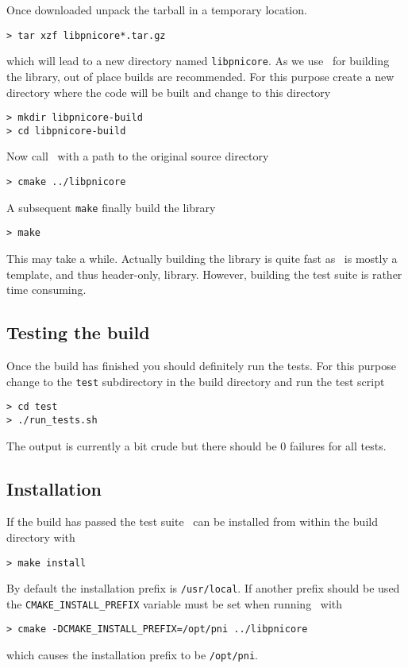 Once downloaded unpack the tarball in a temporary location. 
\begin{verbatim}
> tar xzf libpnicore*.tar.gz
\end{verbatim}
which will lead to a new directory named {\tt libpnicore}. As we use \cmake\ for
building the library, out of place builds are recommended. For this purpose 
create a new directory where the code will be built and change to this directory
\begin{verbatim}
> mkdir libpnicore-build
> cd libpnicore-build
\end{verbatim}
Now call \cmake\ with a path to the original source directory
\begin{verbatim}
> cmake ../libpnicore
\end{verbatim}
A subsequent {\tt make} finally build the library
\begin{verbatim}
> make
\end{verbatim}
This may take a while. Actually building the library is quite fast as
\libpnicore\ is mostly a template, and thus header-only, library. 
However, building the test suite is rather time consuming. 

\subsection{Testing the build}

Once the build has finished you should definitely run the tests. For this
purpose change to the {\tt test} subdirectory in the build directory and run 
the test script
\begin{verbatim}
> cd test
> ./run_tests.sh
\end{verbatim}
The output is currently a bit crude but there should be $0$ failures for all
tests.

\subsection{Installation}

If the build has passed the test suite \libpnicore\ can be installed from within
the build directory with
\begin{verbatim}
> make install
\end{verbatim}
By default the installation prefix is {\tt /usr/local}. If another prefix should
be used the {\tt CMAKE\_INSTALL\_PREFIX} variable must be set when running
\cmake\ with
\begin{verbatim}
> cmake -DCMAKE_INSTALL_PREFIX=/opt/pni ../libpnicore
\end{verbatim}
which causes the installation prefix to be {\tt /opt/pni}. 
